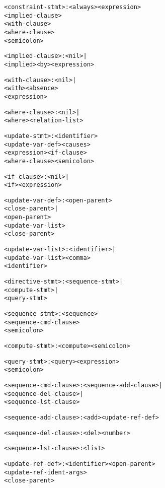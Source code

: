\documentclass[11pt]{report}
\newenvironment{vverbatim}
{
  \begin{alltt}
}
{
    \vspace{-\baselineskip}
  \end{alltt}
}
\begin{document}
\begin{vverbatim}
<constraint-stmt>        : <always> <expression>
                           <implied-clause>
                           <with-clause>
                           <where-clause>
                           <semicolon>

<implied-clause>         : <nil> |
                           <implied> <by> <expression>

<with-clause>            : <nil> |
                           <with> <absence>
                           <expression>

<where-clause>           : <nil> |
                           <where> <relation-list>

<update-stmt>            : <identifier>
                           <update-var-def> <causes>
                           <expression> <if-clause>
                           <where-clause> <semicolon>

<if-clause>              : <nil> |
                           <if> <expression>

<update-var-def>         : <open-parent>
                           <close-parent> |
                           <open-parent>
                           <update-var-list>
                           <close-parent>

<update-var-list>        : <identifier> |
                           <update-var-list> <comma>
                           <identifier>

<directive-stmt>         : <sequence-stmt> |
                           <compute-stmt> |
                           <query-stmt>

<sequence-stmt>          : <sequence>
                           <sequence-cmd-clause>
                           <semicolon>

<compute-stmt>           : <compute> <semicolon>

<query-stmt>             : <query> <expression>
                           <semicolon>

<sequence-cmd-clause>    : <sequence-add-clause> |
                           <sequence-del-clause> |
                           <sequence-lst-clause>

<sequence-add-clause>    : <add> <update-ref-def>

<sequence-del-clause>    : <del> <number>

<sequence-lst-clause>    : <list>

<update-ref-def>         : <identifier> <open-parent>
                           <update-ref-ident-args>
                           <close-parent>


\end{vverbatim}
\end{document}
